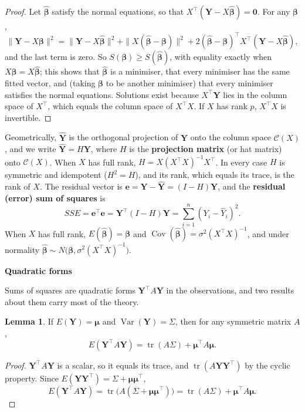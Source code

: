 \documentclass[11pt,a4paper]{article}
\numberwithin{equation}{section}
\DeclareMathOperator{\Var}{Var}
\DeclareMathOperator{\Cov}{Cov}
\theoremstyle{definition}
\newtheorem{lem}[thm]{Lemma}
\newcommand{\subhead}[1]{%
  \par\medskip\noindent\textbf{#1}\par\nobreak\smallskip}
\begin{document}
\begin{proof}
Let $\hat{\boldsymbol\beta}$ satisfy the normal equations, so that $X^\top(\mathbf Y - X\hat{\boldsymbol\beta}) = \mathbf 0$. For any $\boldsymbol\beta$,
\[
\|\mathbf Y - X\boldsymbol\beta\|^2 = \|\mathbf Y - X\hat{\boldsymbol\beta}\|^2 + \|X(\hat{\boldsymbol\beta} - \boldsymbol\beta)\|^2 + 2(\hat{\boldsymbol\beta} - \boldsymbol\beta)^\top X^\top(\mathbf Y - X\hat{\boldsymbol\beta}) ,
\]
and the last term is zero. So $S(\boldsymbol\beta) \ge S(\hat{\boldsymbol\beta})$, with equality exactly when $X\boldsymbol\beta = X\hat{\boldsymbol\beta}$; this shows that $\hat{\boldsymbol\beta}$ is a minimiser, that every
minimiser has the same fitted vector, and (taking $\boldsymbol\beta$ to be another minimiser) that every minimiser satisfies the normal equations. Solutions exist
because $X^\top\mathbf Y$ lies in the column space of $X^\top$, which equals the column space of $X^\top X$. If $X$ has rank $p$, $X^\top X$ is invertible.
\end{proof}

Geometrically, $\hat{\mathbf Y}$ is the orthogonal projection of $\mathbf Y$ onto the column space $\mathcal C(X)$, and we write $\hat{\mathbf Y} = H\mathbf Y$, where $H$ is the
\textbf{projection matrix} (or hat matrix) onto $\mathcal C(X)$. When $X$ has full rank, $H = X(X^\top X)^{-1}X^\top$. In every case $H$ is symmetric and idempotent
($H^2 = H$), and its rank, which equals its trace, is the rank of $X$. The residual vector is $\mathbf e = \mathbf Y - \hat{\mathbf Y} = (I - H)\mathbf Y$, and the
\textbf{residual (error) sum of squares} is
\[
SSE = \mathbf e^\top\mathbf e = \mathbf Y^\top(I - H)\mathbf Y = \sum_{i=1}^n(Y_i - \hat Y_i)^2 .
\]
When $X$ has full rank, $E(\hat{\boldsymbol\beta}) = \boldsymbol\beta$ and $\Cov(\hat{\boldsymbol\beta}) = \sigma^2(X^\top X)^{-1}$, and under normality $\hat{\boldsymbol\beta} \sim N\bigl(\boldsymbol\beta, \sigma^2(X^\top X)^{-1}\bigr)$.

\subhead{Quadratic forms}
Sums of squares are quadratic forms $\mathbf Y^\top A\mathbf Y$ in the observations, and two results about them carry most of the theory.

\begin{lem}\label{lem:quad-mean}
If $E(\mathbf Y) = \boldsymbol\mu$ and $\Var(\mathbf Y) = \Sigma$, then for any symmetric matrix $A$,
\[
E(\mathbf Y^\top A\mathbf Y) = \operatorname{tr}(A\Sigma) + \boldsymbol\mu^\top A\boldsymbol\mu .
\]
\end{lem}

\begin{proof}
$\mathbf Y^\top A\mathbf Y$ is a scalar, so it equals its trace, and $\operatorname{tr}(A\mathbf Y\mathbf Y^\top)$ by the cyclic property. Since $E(\mathbf Y\mathbf Y^\top) = \Sigma + \boldsymbol\mu\boldsymbol\mu^\top$,
\[
E(\mathbf Y^\top A\mathbf Y) = \operatorname{tr}\bigl(A(\Sigma + \boldsymbol\mu\boldsymbol\mu^\top)\bigr) = \operatorname{tr}(A\Sigma) + \boldsymbol\mu^\top A\boldsymbol\mu .
\]
\end{proof}
\end{document}
